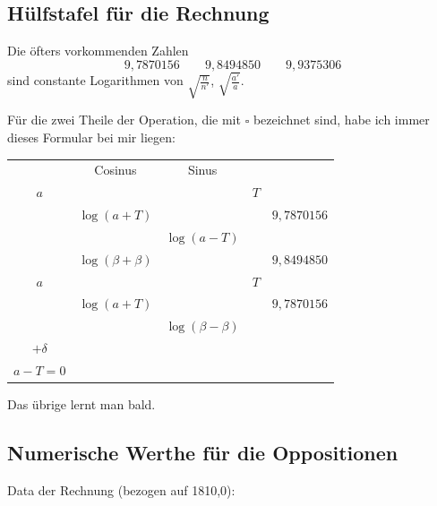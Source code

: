 \documentclass[10pt,a4paper]{article}
\begin{document}
\newpage
\subsection*{Hülfstafel für die Rechnung}

Die öfters vorkommenden Zahlen
\[
9,7870156 \qquad 9,8494850 \qquad 9,9375306
\]
sind constante Logarithmen von $\sqrt{\frac{n}{n'}}$, $\sqrt{\frac{a'}{a}}$.

Für die zwei Theile der Operation, die mit $\square$ bezeichnet sind, habe ich 
immer dieses Formular bei mir liegen:

\begin{center}
\begin{tabular}{ccccc}
& Cosinus & Sinus & & \\
$a$ & & & $T$ & \\
& $\log(a + T)$ & & & $9,7870156$ \\
& & $\log(a - T)$ & & \\
\hline
& $\log(\beta + \beta)$ & & & $9,8494850$ \\
$a$ & & & $T$ & \\
& $\log(a + T)$ & & & $9,7870156$ \\
& & $\log(\beta - \beta)$ & & \\
$+ \delta$ & & & & \\
$a - T = 0$ & & & &
\end{tabular}
\end{center}

Das übrige lernt man bald.

\newpage
\subsection*{Numerische Werthe für die Oppositionen}

Data der Rechnung (bezogen auf 1810,0):
\end{document}

